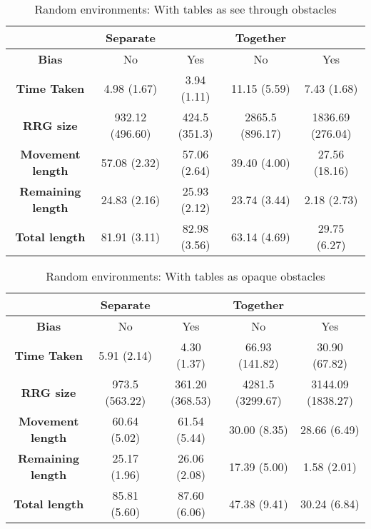 \begin{table}
    \centering
    \tiny
    \begin{tabular}{|c|c|c|c|c|}
		\hline
		\textbf{} & \textbf{Separate} & \textbf{} & \textbf{Together} & \textbf{}\\
		\hline
		\textbf{Bias}             & No & Yes & No & Yes \\
		\hline
		\textbf{Time Taken}       & 4.98 (1.67) & 3.94 (1.11) & 11.15 (5.59) & 7.43 (1.68) \\
		\hline 
		\textbf{RRG size}         & 932.12 (496.60) & 424.5 (351.3) & 2865.5 (896.17) & 1836.69 (276.04) \\
		\hline
		\textbf{Movement length}  & 57.08 (2.32) & 57.06 (2.64) & 39.40 (4.00) & 27.56 (18.16) \\
		\hline
		\textbf{Remaining length} & 24.83 (2.16) & 25.93 (2.12) & 23.74 (3.44) & 2.18 (2.73) \\
		\hline
		\textbf{Total length}     & 81.91 (3.11) & 82.98 (3.56) & 63.14 (4.69) & 29.75 (6.27) \\
		\hline
	\end{tabular}
    \caption{Random environments: With tables as see through obstacles
    \label{tab:resultsrandomopaque}}
\end{table}

\begin{table}
    \centering
    \tiny
    \begin{tabular}{|c|c|c|c|c|}
		\hline
		\textbf{} & \textbf{Separate} & \textbf{} & \textbf{Together} & \textbf{}\\
		\hline
		\textbf{Bias}             & No & Yes & No & Yes \\
		\hline
		\textbf{Time Taken}       & 5.91 (2.14) & 4.30 (1.37) & 66.93 (141.82) & 30.90 (67.82) \\
		\hline 
		\textbf{RRG size}         & 973.5 (563.22) & 361.20 (368.53) & 4281.5 (3299.67) & 3144.09 (1838.27) \\
		\hline
		\textbf{Movement length}  & 60.64 (5.02) & 61.54 (5.44) & 30.00 (8.35) & 28.66 (6.49) \\
		\hline
		\textbf{Remaining length} & 25.17 (1.96) & 26.06 (2.08) & 17.39 (5.00) & 1.58 (2.01) \\
		\hline
		\textbf{Total length}     & 85.81 (5.60) & 87.60 (6.06) & 47.38 (9.41) & 30.24 (6.84) \\
		\hline
	\end{tabular}
    \caption{Random environments: With tables as opaque obstacles
    \label{tab:resultsrandomopaque}}
\end{table}


